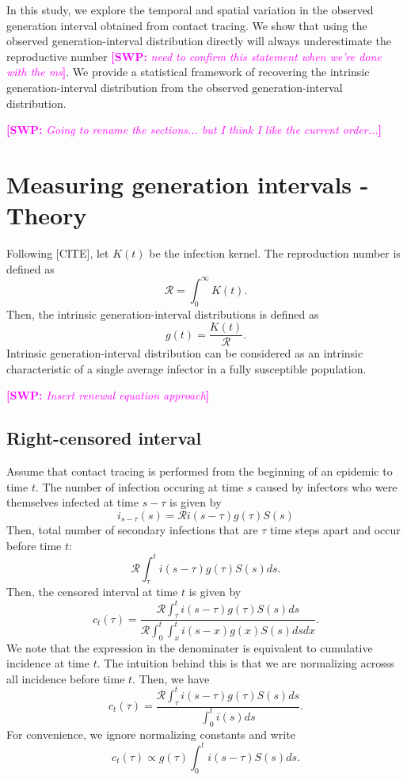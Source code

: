\documentclass{article}
\newcommand{\RR}{\ensuremath{{\mathcal R}}}
\newcommand{\comment}[3]{\textcolor{#1}{\textbf{[#2: }\textsl{#3}\textbf{]}}}
\newcommand{\swp}[1]{\comment{magenta}{SWP}{#1}}
\begin{document}
In this study, we explore the temporal and spatial variation in the observed generation interval obtained from contact tracing.
We show that using the observed generation-interval distribution directly will always underestimate the reproductive number \swp{need to confirm this statement when we're done with the ms}. 
We provide a statistical framework of recovering the intrinsic generation-interval distribution from the observed generation-interval distribution.

\swp{Going to rename the sections... but I think I like the current order...}
\section{Measuring generation intervals - Theory}

Following [CITE], let $K(t)$ be the infection kernel. 
The reproduction number is defined as
$$
\RR = \int_0^\infty K(t).
$$
Then, the intrinsic generation-interval distributions is defined as
$$
g(t) = \frac{K(t)}{\RR}.
$$
Intrinsic generation-interval distribution can be considered as an intrinsic characteristic of a single average infector in a fully susceptible population.

\swp{Insert renewal equation approach}

\subsection{Right-censored interval}

Assume that contact tracing is performed from the beginning of an epidemic to time $t$.
The number of infection occuring at time $s$ caused by infectors who were themselves infected at time $s-\tau$ is given by
\begin{equation}
i_{s-\tau}(s) = \RR i(s-\tau) g(\tau) S(s)
\end{equation}
Then, total number of secondary infections that are $\tau$ time steps apart and occur before time $t$:
\begin{equation}
\RR \int_\tau^t i(s-\tau) g(\tau) S(s) ds.
\end{equation}
Then, the censored interval at time $t$ is given by
\begin{equation}
c_t(\tau)= \frac{\RR \int_\tau^t i(s-\tau) g(\tau) S(s) ds}{\RR \int_0^t \int_x^t i(s-x) g(x) S(s) ds dx}.
\end{equation}
We note that the expression in the denominater is equivalent to cumulative incidence at time $t$.
The intuition behind this is that we are normalizing acrosss all incidence before time $t$.
Then, we have
\begin{equation}
c_t(\tau) = \frac{\RR \int_\tau^t i(s-\tau) g(\tau) S(s) ds}{\int_0^t i(s) ds}.
\end{equation}
For convenience, we ignore normalizing constants and write
\begin{equation}\label{eq:obsg}
c_t(\tau) \propto g(\tau) \int_{0}^t i(s-\tau) S(s) ds.
\end{equation}
\end{document}
